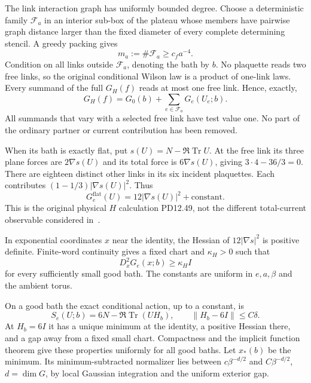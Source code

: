 \documentclass[11pt,letterpaper]{article}
\numberwithin{equation}{section}
\theoremstyle{plain}
\theoremstyle{remark}
\DeclareMathOperator{\Tr}{Tr}
\newcommand{\norm}[1]{\left\lVert#1\right\rVert}
\begin{document}
The link interaction graph has uniformly bounded degree. Choose a deterministic
family $\mathcal F_a$ in an interior sub-box of the plateau whose members have
pairwise graph distance larger than the fixed diameter of every complete
determining stencil. A greedy packing gives
\begin{equation}
 m_a:=\#\mathcal F_a\ge c_f a^{-4}.
 \label{eq:packing}
\end{equation}
Condition on all links outside $\mathcal F_a$, denoting the bath by $b$.
No plaquette reads two free links, so the original conditional Wilson law is a
product of one-link laws. Every summand of the full $G_H(f)$ reads at most one
free link. Hence, exactly,
\begin{equation}
 G_H(f)=G_0(b)+\sum_{e\in\mathcal F_a}G_e(U_e;b).
 \label{eq:additive}
\end{equation}
All summands that vary with a selected free link have test value one. No part of
the ordinary partner or current contribution has been removed.

When its bath is exactly flat, put $s(U)=N-\Re\Tr U$. At the free link its three
plane forces are $2\nabla s(U)$ and its total force is $6\nabla s(U)$, giving
$3\cdot4-36/3=0$. There are eighteen distinct other links in its six incident
plaquettes. Each contributes $(1-1/3)|\nabla s(U)|^2$. Thus
\begin{equation}
 G_e^{\mathrm{flat}}(U)=12|\nabla s(U)|^2+\text{constant}.
 \label{eq:flatlocal}
\end{equation}
This is the original physical $H$ calculation PD12.49, not the different
total-current observable considered in~\cite[pp.~1182--1194]{W}.

In exponential coordinates $x$ near the identity, the Hessian of
$12|\nabla s|^2$ is positive definite. Finite-word continuity gives a fixed chart
and $\kappa_H>0$ such that
\begin{equation}
 D_x^2G_e(x;b)\ge\kappa_HI
 \label{eq:Hhessian}
\end{equation}
for every sufficiently small good bath. The constants are uniform in $e,a,\beta$
and the ambient torus.

On a good bath the exact conditional action, up to a constant, is
\[
 S_e(U;b)=6N-\Re\Tr(UH_b),\qquad \norm{H_b-6I}\le C\delta.
\]
At $H_b=6I$ it has a unique minimum at the identity, a positive Hessian there,
and a gap away from a fixed small chart. Compactness and the implicit function
theorem give these properties uniformly for all good baths. Let $x_*(b)$ be the
minimum. Its minimum-subtracted normalizer lies between
$c\beta^{-d/2}$ and $C\beta^{-d/2}$, $d=\dim G$, by local Gaussian integration
and the uniform exterior gap.
\end{document}
